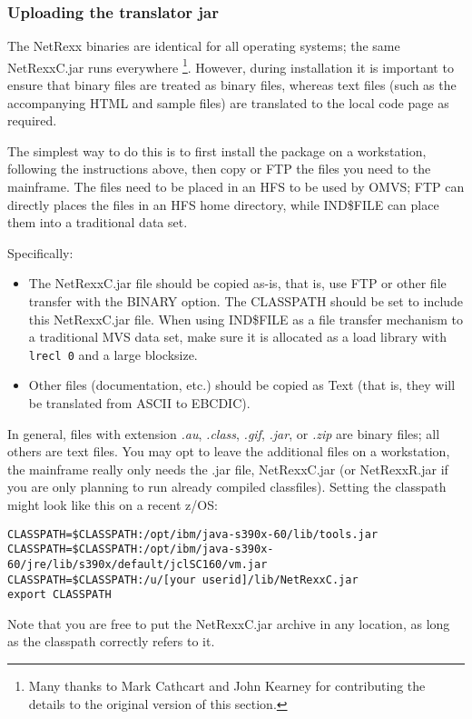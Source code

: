 \subsubsection{Uploading the \nr translator jar}

The NetRexx binaries are identical for all operating systems; the same
NetRexxC.jar runs everywhere \footnote{Many thanks to Mark Cathcart
  and John Kearney for contributing the details to the original version of this section.}.
However, during installation it is important to ensure that binary files
are treated as binary files, whereas text files (such as the
accompanying HTML and sample files) are translated to the local code
page as required.

The simplest way to do this is to first install the package on a
workstation, following the instructions above, then copy or FTP the
files you need to the mainframe.  The files need to be placed in an
HFS to be used by OMVS; FTP can directly places the files in an HFS
home directory, while IND\$FILE can place them into a traditional data
set.

Specifically:
\begin{itemize}
\item The NetRexxC.jar file should be copied as-is, that is, use
FTP or other file transfer with the BINARY option.  The CLASSPATH should
be set to include this NetRexxC.jar file. When using IND\$FILE as a
file transfer mechanism to a traditional MVS data set, make sure it is
allocated as a load library with \texttt{lrecl 0} and a large blocksize.
\item Other files (documentation, etc.) should be copied as Text (that is,
they will be translated from ASCII to EBCDIC).
\end{itemize}

In general, files with extension \emph{.au}, \emph{.class}, \emph{.gif}, \emph{.jar},
or \emph{.zip} are binary files; all others are text files. You may
opt to leave the additional files on a workstation, the mainframe
really only needs the .jar file, NetRexxC.jar (or NetRexxR.jar if you
are only planning to run already compiled classfiles).
Setting the classpath might look like this on a recent z/OS:
\begin{verbatim}
CLASSPATH=$CLASSPATH:/opt/ibm/java-s390x-60/lib/tools.jar
CLASSPATH=$CLASSPATH:/opt/ibm/java-s390x-60/jre/lib/s390x/default/jclSC160/vm.jar
CLASSPATH=$CLASSPATH:/u/[your userid]/lib/NetRexxC.jar
export CLASSPATH
\end{verbatim}
Note that you are free to put the NetRexxC.jar archive in any
location, as long as the classpath correctly refers to it.

